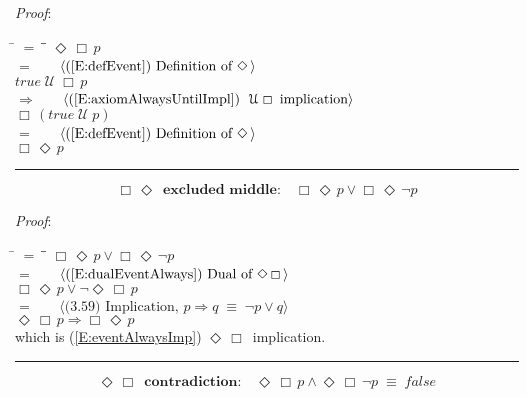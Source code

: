 \documentclass[12pt, fleqn, leqno]{article}
\newcommand{\lgap}{2pt}                             %
\newcommand{\mymathindent}{24pt}                    %
\newcommand{\equivs}{\ensuremath{\;\equiv\;}}       %
\newcommand{\impl}{\ensuremath{\Rightarrow}}        %
\newcommand{\Until}{\;\mathcal{U}\;}
\newcommand{\Event}{\Diamond\,}
\newcommand{\Always}{\Box\,}
\newcommand{\myqed}{\rule[-.23ex]{1.2ex}{2.0ex}}
\newcommand{\myqedtab}{\hspace{384pt}}              %
\newcommand{\Gll} {\langle}                         %
\newcommand{\Ggg} {\rangle}                         %
\newcommand{\Hint}[1]     {\ \ \ $\Gll              \mbox{#1} \Ggg$ }   %
\begin{document}
\emph{Proof}:
\begin{tabbing}
\hspace{\mymathindent} \= $= \;$ \= \myqedtab \= \kill
  \> \>   $\Event\Always p$\\[\lgap]
  \> $=$  \>  \Hint{(\ref{E:defEvent}) Definition of $\Event$}\\[\lgap]
  \> \>   $true\Until \Always p$\\[\lgap]
  \> $\impl$ \> \Hint{(\ref{E:axiomAlwaysUntilImpl}) $\Until\Always$ implication}\\[\lgap]
  \> \>   $\Always (true\Until p)$\\[\lgap]
  \> $=$  \>  \Hint{(\ref{E:defEvent}) Definition of $\Event$}\\[\lgap]
  \> \>   $\Always\Event p$ \quad \myqed
\end{tabbing}
\begin{equation}\label{E:AEexcludedMid2}
\textbf{$\Always \Event $ excluded middle:}\quad \Always \Event p \lor \Always \Event\neg p
\end{equation}

\emph{Proof}:
\begin{tabbing}
\hspace{\mymathindent} \= $= \;$ \= \myqedtab \= \kill
  \> \>   $\Always \Event p \lor \Always \Event\neg p$\\[\lgap]
  \> $=$  \>  \Hint{(\ref{E:dualEventAlways}) Dual of $\Event \Always$}\\[\lgap]
  \> \>   $\Always \Event p \lor \neg \Event\Always p$\\[\lgap]
  \> $=$  \>  \Hint{(3.59) Implication, $p\impl q \equivs \neg p \lor q$}\\[\lgap]
  \> \>   $\Event \Always p \impl \Always \Event p$\\[\lgap]
  \> which is (\ref{E:eventAlwaysImp}) $\Event \Always$ implication. \quad \myqed
\end{tabbing}
\begin{equation}\label{E:EAcontradiction2}
\textbf{$\Event \Always$ contradiction:}\quad \Event \Always p \land \Event \Always \neg p \equivs false
\end{equation}
\end{document}
